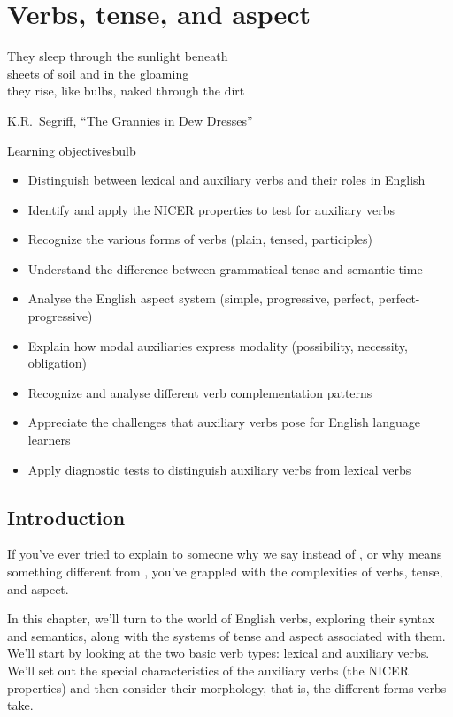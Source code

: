 \chapter{Verbs, tense, and aspect}\label{ch:verbs}

\epigraph{They sleep through the sunlight beneath\\
sheets of soil and in the gloaming\\
they rise, like bulbs, naked through the dirt}{K.R.\ Segriff, \enquote{The Grannies in Dew Dresses}}

\begin{tblsframedsymbol}{Learning objectives}{bulb}
\begin{itemize}[noitemsep, leftmargin=*]
    \item Distinguish between lexical and auxiliary verbs and their roles in English
    \item Identify and apply the NICER properties to test for auxiliary verbs
    \item Recognize the various forms of verbs (plain, tensed, participles)
    \item Understand the difference between grammatical tense and semantic time
    \item Analyse the English aspect system (simple, progressive, perfect, perfect-progressive)
    \item Explain how modal auxiliaries express modality (possibility, necessity, obligation)
    \item Recognize and analyse different verb complementation patterns
    \item Appreciate the challenges that auxiliary verbs pose for English language learners
    \item Apply diagnostic tests to distinguish auxiliary verbs from lexical verbs
\end{itemize}
\end{tblsframedsymbol}

\section{Introduction}
If you've ever tried to explain to someone why we say  instead of , or why  means something different from , you've grappled with the complexities of verbs, tense, and aspect.

In this chapter, we'll turn to the world of English verbs, exploring their syntax and semantics, along with the systems of tense and aspect associated with them. We'll start by looking at the two basic verb types: lexical and auxiliary verbs. We'll set out the special characteristics of the auxiliary verbs (the NICER properties) and then consider their morphology, that is, the different forms verbs take.

